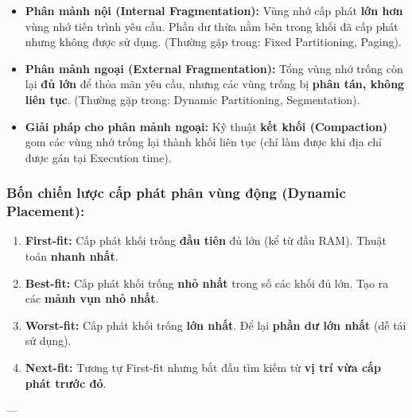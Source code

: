 \documentclass[11pt,a4paper]{article}
\begin{document}
\begin{summarybox}
\begin{itemize}[noitemsep]
    \item \textbf{Phân mảnh nội (Internal Fragmentation):} Vùng nhớ cấp phát \textbf{lớn hơn} vùng nhớ tiến trình yêu cầu. Phần dư thừa nằm bên trong khối đã cấp phát nhưng không được sử dụng. (Thường gặp trong: Fixed Partitioning, Paging).
    \item \textbf{Phân mảnh ngoại (External Fragmentation):} Tổng vùng nhớ trống còn lại \textbf{đủ lớn} để thỏa mãn yêu cầu, nhưng các vùng trống bị \textbf{phân tán, không liên tục}. (Thường gặp trong: Dynamic Partitioning, Segmentation).
    \item \textbf{Giải pháp cho phân mảnh ngoại:} Kỹ thuật \textbf{kết khối (Compaction)} gom các vùng nhớ trống lại thành khối liên tục (chỉ làm được khi địa chỉ được gán tại Execution time).
\end{itemize}
\end{summarybox}

\subsubsection*{Bốn chiến lược cấp phát phân vùng động (Dynamic Placement):}
\begin{enumerate}[noitemsep]
    \item \textbf{First-fit:} Cấp phát khối trống \textbf{đầu tiên} đủ lớn (kể từ đầu RAM). Thuật toán \textbf{nhanh nhất}.
    \item \textbf{Best-fit:} Cấp phát khối trống \textbf{nhỏ nhất} trong số các khối đủ lớn. Tạo ra các \textbf{mảnh vụn nhỏ nhất}.
    \item \textbf{Worst-fit:} Cấp phát khối trống \textbf{lớn nhất}. Để lại \textbf{phần dư lớn nhất} (dễ tái sử dụng).
    \item \textbf{Next-fit:} Tương tự First-fit nhưng bắt đầu tìm kiếm từ \textbf{vị trí vừa cấp phát trước đó}.
\end{enumerate}

---
\end{document}
